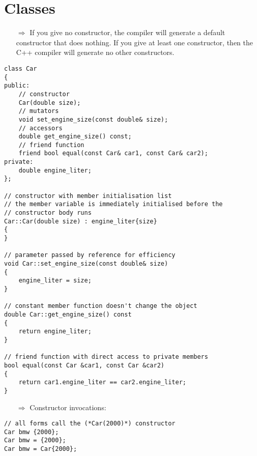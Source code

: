 \documentclass[10pt]{article}
\begin{document}
\section{Classes}
\small
\begin{enumerate}
\item[$\Rightarrow$] If you give no constructor, the compiler will generate a default constructor that does nothing.
If you give at least one constructor, then the C++ compiler will generate no other constructors.
\end{enumerate}
\begin{lstlisting}
class Car
{
public:
    // constructor
    Car(double size);
    // mutators
    void set_engine_size(const double& size);
    // accessors
    double get_engine_size() const;
    // friend function
    friend bool equal(const Car& car1, const Car& car2);
private:	
    double engine_liter;
};

// constructor with member initialisation list
// the member variable is immediately initialised before the
// constructor body runs
Car::Car(double size) : engine_liter{size}
{
}

// parameter passed by reference for efficiency
void Car::set_engine_size(const double& size)
{
    engine_liter = size;
}

// constant member function doesn't change the object
double Car::get_engine_size() const
{
    return engine_liter;
}

// friend function with direct access to private members
bool equal(const Car &car1, const Car &car2)
{
    return car1.engine_liter == car2.engine_liter;
}
\end{lstlisting}
\begin{enumerate}
\item[$\Rightarrow$] Constructor invocations:
\end{enumerate}
\begin{lstlisting}
// all forms call the (*Car(2000)*) constructor
Car bmw {2000};
Car bmw = {2000};
Car bmw = Car{2000};
\end{lstlisting}
%
%
\end{document}
